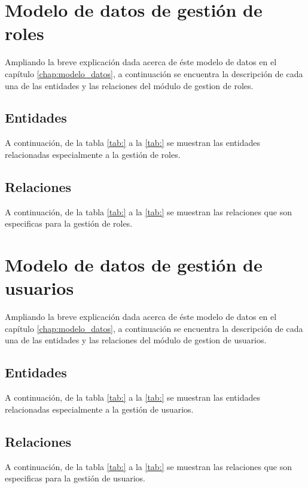 \section{Modelo de datos de gestión de roles}
Ampliando la breve explicación dada acerca de éste modelo de datos en el capítulo \ref{chap:modelo_datos}, a continuación se encuentra la descripción de cada una de las entidades y las relaciones del módulo de gestion de roles.
\subsection{Entidades}
A continuación, de la tabla \ref{tab:} a la \ref{tab:} se muestran las entidades relacionadas especialmente a la gestión de roles.


\subsection{Relaciones}
A continuación, de la tabla \ref{tab:} a la \ref{tab:} se muestran las relaciones que son especificas para la gestión de roles.



\section{Modelo de datos de gestión de usuarios}
Ampliando la breve explicación dada acerca de éste modelo de datos en el capítulo \ref{chap:modelo_datos}, a continuación se encuentra la descripción de cada una de las entidades y las relaciones del módulo de gestion de usuarios.
\subsection{Entidades}
A continuación, de la tabla \ref{tab:} a la \ref{tab:} se muestran las entidades relacionadas especialmente a la gestión de usuarios.




\subsection{Relaciones}
A continuación, de la tabla \ref{tab:} a la \ref{tab:} se muestran las relaciones que son especificas para la gestión de usuarios.




